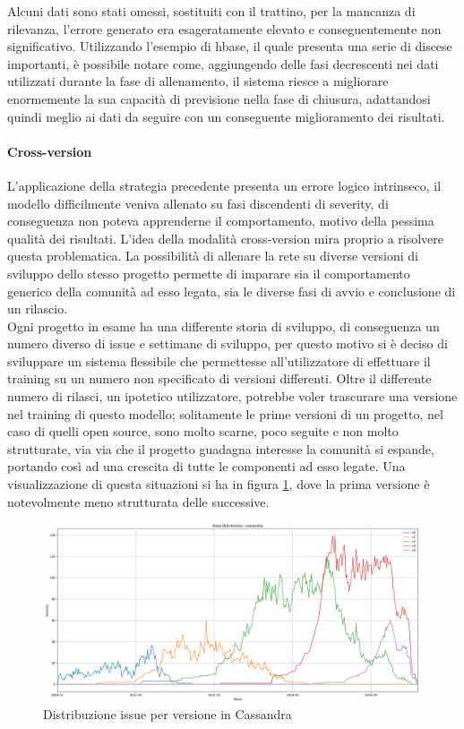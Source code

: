 \documentclass[%
    corpo=12pt,
    twoside,
    oldstyle,
    autoretitolo,
    greek,
    evenboxes,
]{toptesi}
\begin{document}
Alcuni dati sono stati omessi, sostituiti con il trattino, per la mancanza di rilevanza, l'errore generato era esageratamente elevato e conseguentemente non significativo.
Utilizzando l'esempio di hbase, il quale presenta una serie di discese importanti, è possibile notare come, aggiungendo delle fasi decrescenti nei dati utilizzati durante la fase di allenamento, il sistema riesce a migliorare enormemente la sua capacità di previsione nella fase di chiusura, adattandosi quindi meglio ai dati da seguire con un conseguente miglioramento dei risultati.

\paragraph{Cross-version} L'applicazione della strategia precedente presenta un errore logico intrinseco, il modello difficilmente veniva allenato su fasi discendenti di severity, di conseguenza non poteva apprenderne il comportamento, motivo della pessima qualità dei risultati. L'idea della modalità cross-version mira proprio a risolvere questa problematica. La possibilità di allenare la rete su diverse versioni di sviluppo dello stesso progetto permette di imparare sia il comportamento generico della comunità ad esso legata, sia le diverse fasi di avvio e conclusione di un rilascio.\\
Ogni progetto in esame ha una differente storia di sviluppo, di conseguenza un numero diverso di issue e settimane di sviluppo, per questo motivo si è deciso di sviluppare un sistema flessibile che permettesse all'utilizzatore di effettuare il training su un numero non specificato di versioni differenti. Oltre il differente numero di rilasci, un ipotetico utilizzatore, potrebbe voler trascurare una versione nel training di questo modello; solitamente le prime versioni di un progetto, nel caso di quelli open source, sono molto scarne, poco seguite e non molto strutturate, via via che il progetto guadagna interesse la comunità si espande, portando così ad una crescita di tutte le componenti ad esso legate. Una visualizzazione di questa situazioni si ha in figura \ref{fig:cassandra_vers}, dove la prima versione è notevolmente meno strutturata delle successive.
\begin{figure}[!ht]
  \includegraphics[width=\linewidth]{figure/cassandra_vers.png}
  \caption{Distribuzione issue per versione in Cassandra}
  \label{fig:cassandra_vers}
\end{figure}
\end{document}
